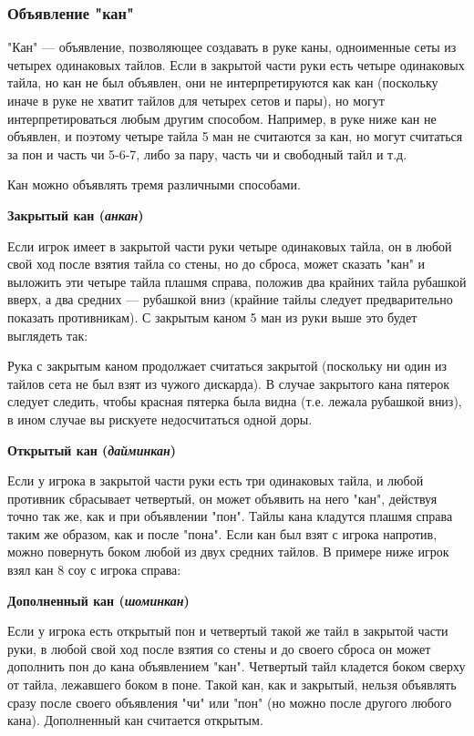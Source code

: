 \subsubsection{Объявление "кан"}

"Кан" --- объявление, позволяющее создавать в руке каны, одноименные сеты из четырех одинаковых тайлов. Если в закрытой части руки есть четыре одинаковых тайла, но кан не был объявлен, они не интерпретируются как кан (поскольку иначе в руке не хватит тайлов для четырех сетов и пары), но могут интерпретироваться любым другим способом. Например, в руке ниже кан не объявлен, и поэтому четыре тайла 5 ман не считаются за кан, но могут считаться за пон и часть чи 5-6-7, либо за пару, часть чи и свободный тайл и т.д.


Кан можно объявлять тремя различными способами.

\textbf{Закрытый кан (\textit{анкан})}

Если игрок имеет в закрытой части руки четыре одинаковых тайла, он в любой свой ход после взятия тайла со стены, но до сброса, может сказать "кан" и выложить эти четыре тайла плашмя справа, положив два крайних тайла рубашкой вверх, а два средних --- рубашкой вниз (крайние тайлы следует предварительно показать противникам). С закрытым каном 5 ман из руки выше это будет выглядеть так:

 \hfill {}

Рука с закрытым каном продолжает считаться закрытой (поскольку ни один из тайлов сета не был взят из чужого дискарда). В случае закрытого кана пятерок следует следить, чтобы красная пятерка была видна (т.е. лежала рубашкой вниз), в ином случае вы рискуете недосчитаться одной доры.

\textbf{Открытый кан (\textit{дайминкан})}

Если у игрока в закрытой части руки есть три одинаковых тайла, и любой противник сбрасывает четвертый, он может объявить на него "кан", действуя точно так же, как и при объявлении "пон". Тайлы кана кладутся плашмя справа таким же образом, как и после "пона". Если кан был взят с игрока напротив, можно повернуть боком любой из двух средних тайлов. В примере ниже игрок взял кан 8 соу с игрока справа:

 \hfill {}

\textbf{Дополненный кан (\textit{шоминкан})}

Если у игрока есть открытый пон и четвертый такой же тайл в закрытой части руки, в любой свой ход после взятия со стены и до своего сброса он может дополнить пон до кана объявлением "кан". Четвертый тайл кладется боком сверху от тайла, лежавшего боком в поне. Такой кан, как и закрытый, нельзя объявлять сразу после своего объявления "чи" или "пон" (но можно после другого любого кана). Дополненный кан считается открытым.

